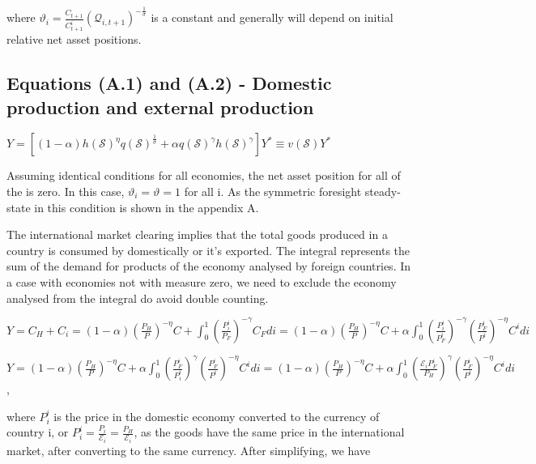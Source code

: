 \documentclass[
]{article}
\begin{document}
where
\(\displaystyle \vartheta_i = \frac{C_{t+1}}{C_{t+1}^i} (\mathcal{Q}_{i,t+1})^{-\frac{1}{\sigma}}\)
is a constant and generally will depend on initial relative net asset
positions.

\vspace{12pt}

\hypertarget{equations-a.1-and-a.2---domestic-production-and-external-production}{%
\subsection{Equations (A.1) and (A.2) - Domestic production and external
production}\label{equations-a.1-and-a.2---domestic-production-and-external-production}}

\(\displaystyle Y = \left[ (1-\alpha)h(\mathcal{S})^{\eta} q(\mathcal{S})^\frac{1}{\sigma} + \alpha q(\mathcal{S})^{\gamma} h(\mathcal{S})^{\gamma} \right]Y^* \equiv v (\mathcal{S})Y^*\)

\vspace{8pt}

Assuming identical conditions for all economies, the net asset position
for all of the is zero. In this case, \(\vartheta_i = \vartheta = 1\)
for all i. As the symmetric foresight steady-state in this condition is
shown in the appendix A.

The international market clearing implies that the total goods produced
in a country is consumed by domestically or it's exported. The integral
represents the sum of the demand for products of the economy analysed by
foreign countries. In a case with economies not with measure zero, we
need to exclude the economy analysed from the integral do avoid double
counting.

\(\displaystyle Y=C_H+C_i=(1-\alpha)\left( \frac{P_{H}}{P} \right)^{-\eta}C + \int_0^1 \left( \frac{P_i^i}{P_F} \right)^{-\gamma}C_F di = (1-\alpha)\left( \frac{P_{H}}{P} \right)^{-\eta}C + \alpha \int_0^1 \left( \frac{P_i^i}{P_F^i} \right)^{-\gamma} \left( \frac{P_{F}^i}{P^i} \right)^{-\eta}C^idi\)

\(\displaystyle Y= (1-\alpha)\left( \frac{P_{H}}{P} \right)^{-\eta}C + \alpha \int_0^1 \left( \frac{P_F^i}{P_i^i} \right)^{\gamma} \left( \frac{P_{F}^i}{P^i} \right)^{-\eta}C^idi= (1-\alpha)\left( \frac{P_{H}}{P} \right)^{-\eta}C + \alpha \int_0^1 \left( \frac{\mathcal{E}_i P_F^i }{P_H} \right)^{\gamma} \left( \frac{P_{F}^i}{P^i} \right)^{-\eta}C^idi\),

where \(P_i^i\) is the price in the domestic economy converted to the
currency of country i, or
\(\displaystyle P_i^i = \frac{P_i}{\mathcal{E}_i} = \frac{P_H}{\mathcal{E}_i}\),
as the goods have the same price in the international market, after
converting to the same currency. After simplifying, we have
\end{document}
